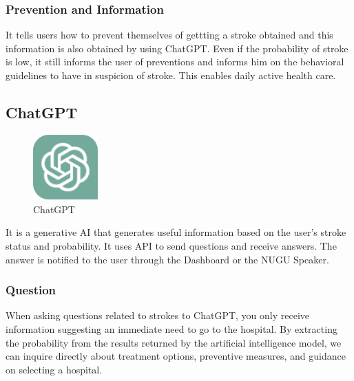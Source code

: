 \subsubsection{\textbf{Prevention and Information}}
It tells users how to prevent themselves of gettting a stroke obtained and this information is also obtained by using ChatGPT. Even if the probability of stroke is low, it still informs the user of preventions and informs him on the behavioral guidelines to have in suspicion of stroke. This enables daily active health care.\\

\subsection{\textbf{ChatGPT}}

\begin{figure}[htp]
\centering
\includegraphics[width=2.5cm]{images/chatgpt.png}
\caption{ChatGPT}
\label{fig:chatgpt}
\end{figure}

It is a generative AI that generates useful information based on the user's stroke status and probability. It uses API to send questions and receive answers. The answer is notified to the user through the Dashboard or the NUGU Speaker.\\
\subsubsection{\textbf{Question}}
When asking questions related to strokes to ChatGPT, you only receive information suggesting an immediate need to go to the hospital. By extracting the probability from the results returned by the artificial intelligence model, we can inquire directly about treatment options, preventive measures, and guidance on selecting a hospital.\\
